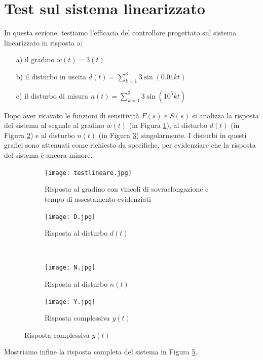 \documentclass[a4paper, 11pt]{article}
\begin{document}
	\clearpage
	
	\section{Test sul sistema linearizzato}
	
	In questa sezione, testiamo l'efficacia del controllore progettato sul sistema linearizzato in risposta a:
	\begin{itemize}
		\item[a)] il gradino $w(t)=3(t)$
		\item[b)] il disturbo in uscita $d(t)=\sum_{k=1}^{3}3\sin(0.01kt)$
		\item[c)] il disturbo di misura $n(t)=\sum_{k=1}^{3}3\sin(10^5kt)$
	\end{itemize}
	Dopo aver ricavato le funzioni di sensitività $F(s)$ e $S(s)$ si analizza la risposta del sistema al segnale
	al gradino $w(t)$ (in Figura \ref{fig:testlin}), al disturbo $d(t)$ (in Figura \ref{fig:D}) e al disturbo $n(t)$ (in Figura \ref{fig:N}) singolarmente. I disturbi in questi grafici sono attenuati come richiesto da specifiche, per evidenziare che la risposta del sistema è ancora minore.
	
	\begin{figure}[h!]
		\centering
		\begin{subfigure}{0.49\linewidth}
			\centering
			\texttt{[image: testlineare.jpg]}
			\caption{Risposta al gradino con vincoli di sovraelongazione e tempo di assestamento evidenziati}
			\label{fig:testlin}
		\end{subfigure}
		\hfill
		\begin{subfigure}{0.49\linewidth}
			\texttt{[image: D.jpg]}
			\caption{Risposta al disturbo $d(t)$}
			\label{fig:D}
		\end{subfigure}
		\\
		\begin{subfigure}{0.49\linewidth}
			\texttt{[image: N.jpg]}
			\caption{Risposta al disturbo $n(t)$}
			\label{fig:N}
		\end{subfigure}
		\hfill
		\begin{subfigure}{0.49\linewidth}
			\texttt{[image: Y.jpg]}
			\caption{Risposta complessiva $y(t)$}
			\label{fig:Y}
		\end{subfigure}
	\end{figure}
	
	Mostriamo infine la risposta completa del sistema in Figura \ref{fig:Y}.
	
	
	\clearpage
	
\end{document}
